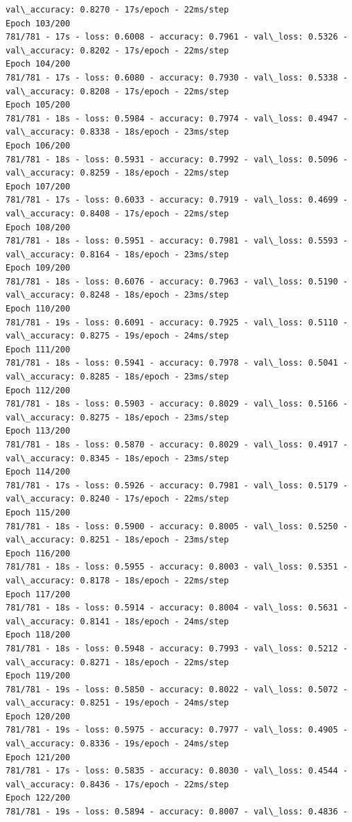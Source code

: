 \documentclass[11pt]{article}
\begin{document}
\begin{Verbatim}[commandchars=\\\{\}]
val\_accuracy: 0.8270 - 17s/epoch - 22ms/step
Epoch 103/200
781/781 - 17s - loss: 0.6008 - accuracy: 0.7961 - val\_loss: 0.5326 -
val\_accuracy: 0.8202 - 17s/epoch - 22ms/step
Epoch 104/200
781/781 - 17s - loss: 0.6080 - accuracy: 0.7930 - val\_loss: 0.5338 -
val\_accuracy: 0.8208 - 17s/epoch - 22ms/step
Epoch 105/200
781/781 - 18s - loss: 0.5984 - accuracy: 0.7974 - val\_loss: 0.4947 -
val\_accuracy: 0.8338 - 18s/epoch - 23ms/step
Epoch 106/200
781/781 - 18s - loss: 0.5931 - accuracy: 0.7992 - val\_loss: 0.5096 -
val\_accuracy: 0.8259 - 18s/epoch - 22ms/step
Epoch 107/200
781/781 - 17s - loss: 0.6033 - accuracy: 0.7919 - val\_loss: 0.4699 -
val\_accuracy: 0.8408 - 17s/epoch - 22ms/step
Epoch 108/200
781/781 - 18s - loss: 0.5951 - accuracy: 0.7981 - val\_loss: 0.5593 -
val\_accuracy: 0.8164 - 18s/epoch - 23ms/step
Epoch 109/200
781/781 - 18s - loss: 0.6076 - accuracy: 0.7963 - val\_loss: 0.5190 -
val\_accuracy: 0.8248 - 18s/epoch - 23ms/step
Epoch 110/200
781/781 - 19s - loss: 0.6091 - accuracy: 0.7925 - val\_loss: 0.5110 -
val\_accuracy: 0.8275 - 19s/epoch - 24ms/step
Epoch 111/200
781/781 - 18s - loss: 0.5941 - accuracy: 0.7978 - val\_loss: 0.5041 -
val\_accuracy: 0.8285 - 18s/epoch - 23ms/step
Epoch 112/200
781/781 - 18s - loss: 0.5903 - accuracy: 0.8029 - val\_loss: 0.5166 -
val\_accuracy: 0.8275 - 18s/epoch - 23ms/step
Epoch 113/200
781/781 - 18s - loss: 0.5870 - accuracy: 0.8029 - val\_loss: 0.4917 -
val\_accuracy: 0.8345 - 18s/epoch - 23ms/step
Epoch 114/200
781/781 - 17s - loss: 0.5926 - accuracy: 0.7981 - val\_loss: 0.5179 -
val\_accuracy: 0.8240 - 17s/epoch - 22ms/step
Epoch 115/200
781/781 - 18s - loss: 0.5900 - accuracy: 0.8005 - val\_loss: 0.5250 -
val\_accuracy: 0.8251 - 18s/epoch - 23ms/step
Epoch 116/200
781/781 - 18s - loss: 0.5955 - accuracy: 0.8003 - val\_loss: 0.5351 -
val\_accuracy: 0.8178 - 18s/epoch - 22ms/step
Epoch 117/200
781/781 - 18s - loss: 0.5914 - accuracy: 0.8004 - val\_loss: 0.5631 -
val\_accuracy: 0.8141 - 18s/epoch - 24ms/step
Epoch 118/200
781/781 - 18s - loss: 0.5948 - accuracy: 0.7993 - val\_loss: 0.5212 -
val\_accuracy: 0.8271 - 18s/epoch - 22ms/step
Epoch 119/200
781/781 - 19s - loss: 0.5850 - accuracy: 0.8022 - val\_loss: 0.5072 -
val\_accuracy: 0.8251 - 19s/epoch - 24ms/step
Epoch 120/200
781/781 - 19s - loss: 0.5975 - accuracy: 0.7977 - val\_loss: 0.4905 -
val\_accuracy: 0.8336 - 19s/epoch - 24ms/step
Epoch 121/200
781/781 - 17s - loss: 0.5835 - accuracy: 0.8030 - val\_loss: 0.4544 -
val\_accuracy: 0.8436 - 17s/epoch - 22ms/step
Epoch 122/200
781/781 - 19s - loss: 0.5894 - accuracy: 0.8007 - val\_loss: 0.4836 -

\end{Verbatim}
\end{document}
